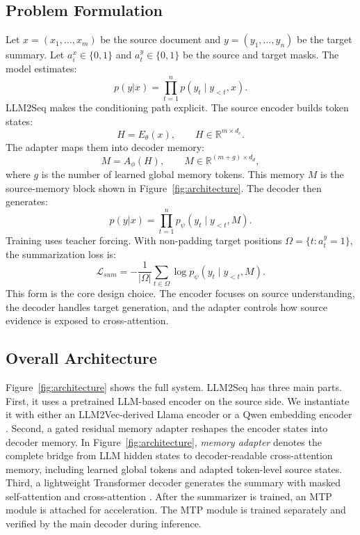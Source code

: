 \documentclass[11pt]{article}
\begin{document}
\subsection{Problem Formulation}

Let $x=(x_1,\ldots,x_m)$ be the source document and $y=(y_1,\ldots,y_n)$ be the target summary.
Let $a^x_i\in\{0,1\}$ and $a^y_t\in\{0,1\}$ be the source and target masks.
The model estimates:
\begin{equation}
p(y|x)=\prod_{t=1}^{n}p(y_t \mid y_{<t},x).
\end{equation}
LLM2Seq makes the conditioning path explicit.
The source encoder builds token states:
\begin{equation}
H=E_{\theta}(x), \qquad H \in \mathbb{R}^{m \times d_e}.
\end{equation}
The adapter maps them into decoder memory:
\begin{equation}
M=A_{\phi}(H), \qquad M \in \mathbb{R}^{(m+g) \times d_d},
\end{equation}
where $g$ is the number of learned global memory tokens.
This memory $M$ is the source-memory block shown in Figure~\ref{fig:architecture}.
The decoder then generates:
\begin{equation}
p(y|x)=\prod_{t=1}^{n}p_{\psi}(y_t \mid y_{<t},M).
\end{equation}
Training uses teacher forcing.
With non-padding target positions $\Omega=\{t:a^y_t=1\}$, the summarization loss is:
\begin{equation}
\mathcal{L}_{sum}
=-\frac{1}{|\Omega|}\sum_{t\in\Omega}
\log p_{\psi}(y_t\mid y_{<t},M).
\end{equation}
This form is the core design choice.
The encoder focuses on source understanding, the decoder handles target generation, and the adapter controls how source evidence is exposed to cross-attention.

\subsection{Overall Architecture}

Figure~\ref{fig:architecture} shows the full system.
LLM2Seq has three main parts.
First, it uses a pretrained LLM-based encoder on the source side.
We instantiate it with either an LLM2Vec-derived Llama encoder or a Qwen embedding encoder \citep{behnamghader2024llm2vec,zhang2025qwen3embedding}.
Second, a gated residual memory adapter reshapes the encoder states into decoder memory.
In Figure~\ref{fig:architecture}, \textit{memory adapter} denotes the complete bridge from LLM hidden states to decoder-readable cross-attention memory, including learned global tokens and adapted token-level source states.
Third, a lightweight Transformer decoder generates the summary with masked self-attention and cross-attention \citep{vaswani2017attention}.
After the summarizer is trained, an MTP module is attached for acceleration.
The MTP module is trained separately and verified by the main decoder during inference.
\end{document}
